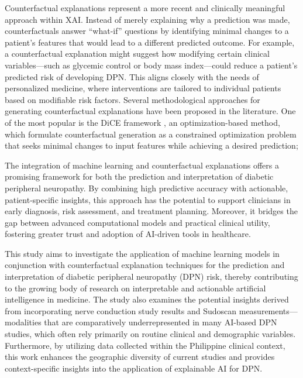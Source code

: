 \documentclass[pdflatex,sn-vancouver-num]{sn-jnl}
\begin{document}
Counterfactual explanations represent a more recent and clinically meaningful approach within XAI. Instead of merely explaining why a prediction was made, counterfactuals answer “what-if” questions by identifying minimal changes to a patient’s features that would lead to a different predicted outcome. For example, a counterfactual explanation might suggest how modifying certain clinical variables—such as glycemic control or body mass index—could reduce a patient’s predicted risk of developing DPN. This aligns closely with the needs of personalized medicine, where interventions are tailored to individual patients based on modifiable risk factors. Several methodological approaches for generating counterfactual explanations have been proposed in the literature. One of the most popular is the DiCE framework \cite{mothilal2020explaining}, an optimization-based method, which formulate counterfactual generation as a constrained optimization problem that seeks minimal changes to input features while achieving a desired prediction;

The integration of machine learning and counterfactual explanations offers a promising framework for both the prediction and interpretation of diabetic peripheral neuropathy. By combining high predictive accuracy with actionable, patient-specific insights, this approach has the potential to support clinicians in early diagnosis, risk assessment, and treatment planning. Moreover, it bridges the gap between advanced computational models and practical clinical utility, fostering greater trust and adoption of AI-driven tools in healthcare. 

This study aims to investigate the application of machine learning models in conjunction with counterfactual explanation techniques for the prediction and interpretation of diabetic peripheral neuropathy (DPN) risk, thereby contributing to the growing body of research on interpretable and actionable artificial intelligence in medicine. The study also examines the potential insights derived from incorporating nerve conduction study results and Sudoscan measurements—modalities that are comparatively underrepresented in many AI-based DPN studies, which often rely primarily on routine clinical and demographic variables. Furthermore, by utilizing data collected within the Philippine clinical context, this work enhances the geographic diversity of current studies and provides context-specific insights into the application of explainable AI for DPN.
\end{document}
